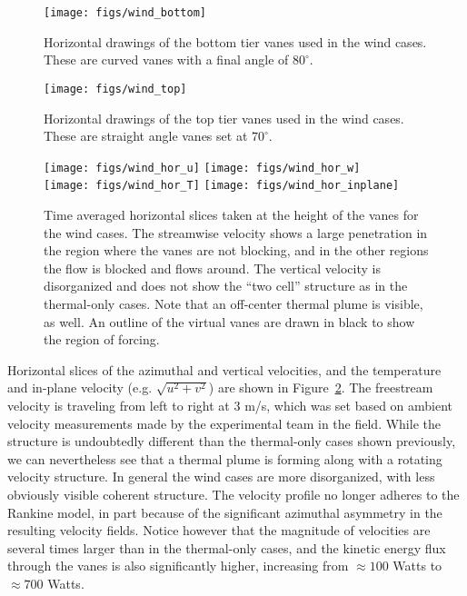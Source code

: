 \begin{figure}[htb]
\centering
\begin{minipage}{0.45\textwidth}
\centering
 \texttt{[image: figs/wind\_bottom]}
 \caption{Horizontal drawings of the bottom tier vanes used in the wind
 cases. These are curved vanes with a final angle of $80^{\circ}$.}
 \label{fig:wind_bottom}  
\end{minipage}\hfill
\begin{minipage}{0.45\textwidth}
\centering
\texttt{[image: figs/wind\_top]}
\caption{Horizontal drawings of the top tier vanes used in the wind
 cases. These are straight angle vanes set at $70^{\circ}$.} 
 \label{fig:wind_top}  
\end{minipage}
\end{figure}


%
%
\begin{figure}[htb]

  \centering
  \texttt{[image: figs/wind\_hor\_u]}
 \hfill
  \texttt{[image: figs/wind\_hor\_w]}
 \\
  \centering
  \texttt{[image: figs/wind\_hor\_T]}
 \hfill
  \texttt{[image: figs/wind\_hor\_inplane]}
 \caption{Time averaged horizontal slices taken at the height of the
 vanes for the wind cases. The streamwise velocity shows a large
 penetration in the region where the vanes are not blocking, and in the
 other regions the flow is blocked and flows around. The vertical
 velocity is disorganized and does not show the ``two cell'' structure
 as in the thermal-only cases.  Note that an off-center thermal plume is
 visible, as well. An outline of the virtual vanes are drawn in black to
 show the region of forcing.}  
 \label{fig:wind-hor}
\end{figure}


Horizontal slices of the azimuthal and vertical velocities, and the 
temperature and in-plane velocity (e.g. $\sqrt{u^2 + v^2}$) are shown in
Figure~\ref{fig:wind-hor}. The freestream velocity is traveling from
left to right at 3 m/s, which was set based on ambient velocity
measurements made by the experimental team in the field. While the
structure is undoubtedly different than the thermal-only cases shown
previously, we can nevertheless see that a thermal plume is forming
along with a rotating velocity structure. In general the wind cases are
more disorganized, with less obviously visible coherent
structure. The velocity profile no longer adheres to the Rankine model,
in part because of the significant azimuthal asymmetry in the resulting
velocity fields. 
Notice however that the magnitude of velocities are several times larger
than in the thermal-only cases, and the kinetic energy flux through the
vanes is also significantly higher, increasing from $\approx 100 $ Watts
to $\approx 700$ Watts.     

